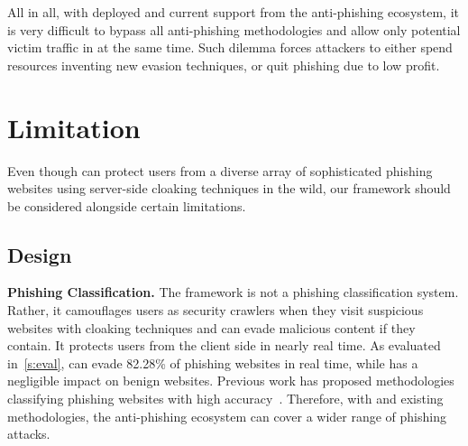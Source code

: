 
All in all, with \spartacus deployed and current support from the anti-phishing ecosystem, 
it is very difficult to bypass all anti-phishing methodologies and allow only potential victim traffic in at the same time.
Such dilemma forces attackers to either spend resources inventing new evasion techniques, or quit phishing due to low profit.


\section{Limitation}

Even though \spartacus can protect users from a diverse array of sophisticated phishing websites using server-side cloaking techniques in the wild,
our framework should be considered alongside certain limitations.


\subsection{\spartacus Design}

\noindent
\textbf{Phishing Classification.}
The \spartacus framework is not a phishing classification system.
Rather, it camouflages users as security crawlers when they visit suspicious websites with cloaking techniques and can evade malicious content if they contain.
It protects users from the client side in nearly real time.
As evaluated in~\autoref{s:eval}, \spartacus can evade 82.28\% of phishing websites in real time, while has a negligible impact on benign websites.
Previous work has proposed methodologies classifying phishing websites with high accuracy~\cite{whittaker2010large, lin2021phishpedia}.
Therefore, with \spartacus and existing methodologies, the anti-phishing ecosystem can cover a wider range of phishing attacks.


